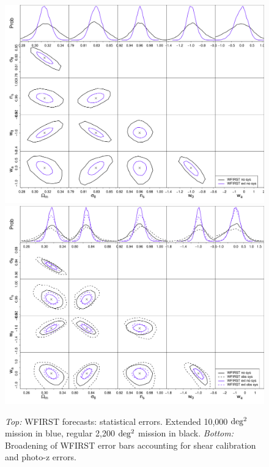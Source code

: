 \begin{figure}
\includegraphics[width=14cm]{Plots/forecasts/WFIRST_no_sys.pdf}
\includegraphics[width=14cm]{Plots/forecasts/WFIRST_obs_sys.pdf}
\caption{\textit{Top:} WFIRST forecasts: statistical errors. Extended 10,000 $\mathrm{deg^2}$ mission in blue, regular 2,200 $\mathrm{deg^2}$ mission in black. \textit{Bottom:} Broadening of WFIRST error bars accounting for shear calibration and photo-z errors.}
         \label{fi:extended}
\end{figure}

